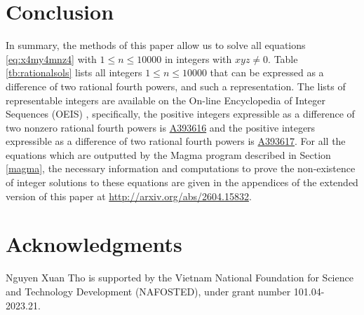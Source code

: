 \documentclass[a4paper,12pt,english,reqno]{amsart}
\begin{document}
\section{Conclusion}
In summary, the methods of this paper allow us to solve all equations \eqref{eq:x4my4mnz4} with $1\leq n\leq 10000$ in integers with $xyz \neq 0$. Table \ref{tb:rationalsols} lists all integers $1\leq n\leq 10000$ that can be expressed as a difference of two rational fourth powers, and such a representation. The lists of representable integers are available on the On-line Encyclopedia of Integer Sequences (OEIS) \cite{oeis}, specifically, the positive integers expressible as a difference of two nonzero rational fourth powers is \href{https://oeis.org/search?q=A393616&language=english&go=Search}{A393616} and the positive integers expressible as a difference of two rational fourth powers is \href{https://oeis.org/search?q=A393617&language=english&go=Search}{A393617}. For all the equations which are outputted by the Magma program described in Section \ref{magma}, the necessary information and computations to prove the non-existence of integer solutions to these equations are given in the appendices of the extended version of this paper at \url{http://arxiv.org/abs/2604.15832}. 


\section{Acknowledgments} 
Nguyen Xuan Tho is supported by the Vietnam National Foundation for Science and Technology Development (NAFOSTED), under grant number 101.04-2023.21.
\end{document}
